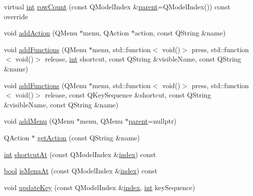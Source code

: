 \begin{DoxyCompactItemize}
\item 
virtual \mbox{\hyperlink{ioapi_8h_a787fa3cf048117ba7123753c1e74fcd6}{int}} \mbox{\hyperlink{class_q_g_b_a_1_1_shortcut_controller_a21899ce0d6770d987af3f0ae299a2de8}{row\+Count}} (const Q\+Model\+Index \&\mbox{\hyperlink{class_q_g_b_a_1_1_shortcut_controller_a03dfea8451c656378e1fb81faf4843ca}{parent}}=Q\+Model\+Index()) const override
\item 
void \mbox{\hyperlink{class_q_g_b_a_1_1_shortcut_controller_a55d3769ac28ea39665096105e683a834}{add\+Action}} (Q\+Menu $\ast$menu, Q\+Action $\ast$action, const Q\+String \&name)
\item 
void \mbox{\hyperlink{class_q_g_b_a_1_1_shortcut_controller_a241282f4512343d3fc9c4c1e7667181b}{add\+Functions}} (Q\+Menu $\ast$menu, std\+::function$<$ void()$>$ press, std\+::function$<$ void()$>$ release, \mbox{\hyperlink{ioapi_8h_a787fa3cf048117ba7123753c1e74fcd6}{int}} shortcut, const Q\+String \&visible\+Name, const Q\+String \&name)
\item 
void \mbox{\hyperlink{class_q_g_b_a_1_1_shortcut_controller_a839498b4fa07fa34756723cf34ccb6a6}{add\+Functions}} (Q\+Menu $\ast$menu, std\+::function$<$ void()$>$ press, std\+::function$<$ void()$>$ release, const Q\+Key\+Sequence \&shortcut, const Q\+String \&visible\+Name, const Q\+String \&name)
\item 
void \mbox{\hyperlink{class_q_g_b_a_1_1_shortcut_controller_adf81c5bc2cb82ad7388892338ab0b68b}{add\+Menu}} (Q\+Menu $\ast$menu, Q\+Menu $\ast$\mbox{\hyperlink{class_q_g_b_a_1_1_shortcut_controller_a03dfea8451c656378e1fb81faf4843ca}{parent}}=nullptr)
\item 
Q\+Action $\ast$ \mbox{\hyperlink{class_q_g_b_a_1_1_shortcut_controller_a8abff3d83926d6ba7b4e44f93e619e23}{get\+Action}} (const Q\+String \&name)
\item 
\mbox{\hyperlink{ioapi_8h_a787fa3cf048117ba7123753c1e74fcd6}{int}} \mbox{\hyperlink{class_q_g_b_a_1_1_shortcut_controller_a5589b06fa6756190e5acf488b0795d35}{shortcut\+At}} (const Q\+Model\+Index \&\mbox{\hyperlink{class_q_g_b_a_1_1_shortcut_controller_ae75cb760bb05d9e1e20b8f1080884cbd}{index}}) const
\item 
\mbox{\hyperlink{libretro_8h_a4a26dcae73fb7e1528214a068aca317e}{bool}} \mbox{\hyperlink{class_q_g_b_a_1_1_shortcut_controller_afcb396dd1166444596103d04c85b5b7d}{is\+Menu\+At}} (const Q\+Model\+Index \&\mbox{\hyperlink{class_q_g_b_a_1_1_shortcut_controller_ae75cb760bb05d9e1e20b8f1080884cbd}{index}}) const
\item 
void \mbox{\hyperlink{class_q_g_b_a_1_1_shortcut_controller_a5a3035a01274244bff7fffe1a09aaf58}{update\+Key}} (const Q\+Model\+Index \&\mbox{\hyperlink{class_q_g_b_a_1_1_shortcut_controller_ae75cb760bb05d9e1e20b8f1080884cbd}{index}}, \mbox{\hyperlink{ioapi_8h_a787fa3cf048117ba7123753c1e74fcd6}{int}} key\+Sequence)

\end{DoxyCompactItemize}
